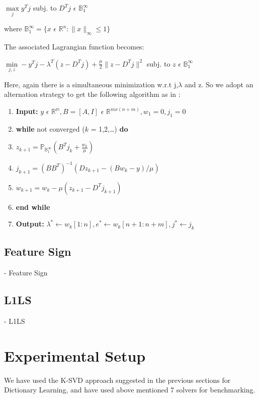 \documentclass{article} %
\begin{document}
\begin{center}
$\max\limits_j y^Tj$ subj. to $D^Tj$ $\epsilon$ $\mathbb{B}_1^\infty$
\end{center}
where $\mathbb{B}_1^\infty = \{x$ $\epsilon$ $\mathbb{R}^n : \|x\|_\infty \leq 1\}$

The associated Lagrangian function becomes:
\begin{center}
$\min\limits_{j,z} -y^Tj - \lambda^T(z-D^Tj) + \frac{\mu}{2}\|z-D^Tj\|^2$ subj. to $z$ $\epsilon$ $\mathbb{B}_1^\infty$
\end{center} 

Here, again there is a simultaneous minimization w.r.t j,$\lambda$ and z. So we adopt an alternation strategy to get the following algorithm as in \citep{yang2010fast}:

\begin{enumerate}
\item \textbf{Input:} $y$ $\epsilon$ $\mathbb{R^m}, B = [A,I]$ $\epsilon$ $\mathbb{R}^{mx(n+m)}, w_1 = 0, j_1 = 0$
\item \textbf{while} not converged ($k$ = 1,2,\ldots) \textbf{do}
\item \hspace{.4cm} $z_{k+1} = \mathbb{P}_{\mathbb{B}_1^\infty}(B^Tj_k + \frac{w_k}{\mu})$
\item \hspace{.4cm} $j_{k+1} = (BB^T)^{-1}(Dz_{k+1} - (Bw_k - y)/\mu)$
\item \hspace{.4cm} $w_{k+1} = w_k - \mu(z_{k+1} - D^Tj_{k+1})$
\item \textbf{end while}
\item \textbf{Output: }$\lambda^{*} \leftarrow w_k[1:n], e^{*} \leftarrow w_k[n+1:n+m], j^{*} \leftarrow j_k$
\end{enumerate}

\subsection{Feature Sign}
  -	Feature Sign
\subsection{L1LS}
  -	L1LS

\vspace{.2cm}
\section{Experimental Setup}
\vspace{.2cm}
We have used the K-SVD approach suggested in the previous sections for Dictionary Learning, and have used above mentioned 7 solvers for benchmarking.
\end{document}
